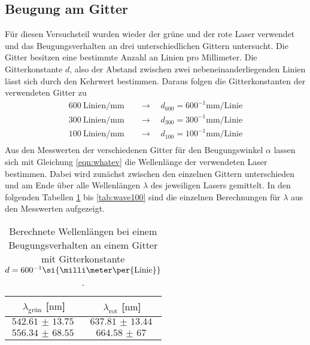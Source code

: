 \subsection{Beugung am Gitter}
Für diesen Versuchsteil wurden wieder der grüne und der rote Laser verwendet und das Beugungsverhalten an drei unterschiedlichen Gittern untersucht. Die Gitter besitzen
eine bestimmte Anzahl an Linien pro Millimeter. Die Gitterkonstante $d$, also der Abstand zwischen zwei nebeneinanderliegenden Linien lässt sich durch den Kehrwert bestimmen. 
Daraus folgen die Gitterkonstanten der verwendeten Gitter zu
\begin{align*}
\SI{600}{{\text{Linien}}\per\milli\meter} \quad &\to \quad d_{600} = {600^{-1}}\si{\milli\meter\per{\text{Linie}}} \\
\SI{300}{{\text{Linien}}\per\milli\meter} \quad &\to \quad d_{300} = {300^{-1}}\si{\milli\meter\per{\text{Linie}}} \\
\SI{100}{{\text{Linien}}\per\milli\meter} \quad &\to \quad d_{100} = {100^{-1}}\si{\milli\meter\per{\text{Linie}}} \\
\end{align*}
Aus den Messwerten der verschiedenen Gitter für den Beugungswinkel $\alpha$ lassen sich mit Gleichung \ref{eqn:whatev} die Wellenlänge der verwendeten Laser bestimmen.
Dabei wird zunächst zwischen den einzelnen Gittern unterschieden und am Ende über alle Wellenlängen $\lambda$ des jeweiligen Lasers gemittelt.
In den folgenden Tabellen \ref{tab:wave600} bis \ref{tab:wave100} sind die einzelnen Berechnungen für $\lambda$ aus den Messwerten aufgezeigt.

\begin{table}
    \centering
    \caption{Berechnete Wellenlängen bei einem Beugungsverhalten an einem Gitter mit Gitterkonstante $\protect d = {600^{-1}}\si{\milli\meter\per{\text{Linie}}}$.}
    \label{tab:wave600}
    \begin{tabular}{c c}
        \toprule
        $\lambda_{\text{grün}}$ [$\si{\nano\meter}$] & $\lambda_{\text{rot}}$ [$\si{\nano\meter}$] \\
        \midrule
        $\SI{542.61(1375)}{}$ & $\SI{637.81(1344)}{}$ \\
        $\SI{556.34(6855)}{}$ & $\SI{664.58(6700)}{}$  \\
        \bottomrule    
    \end{tabular}
\end{table}

